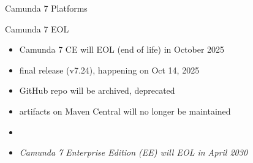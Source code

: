 \documentclass[12pt,aspectratio=169]{beamer}
\begin{document}
\begin{frame}{Camunda 7 Platforms}
\begin{minipage}{0.45\textwidth}
\end{minipage}
\end{frame}


\begin{frame}{Camunda 7 EOL}
\begin{itemize}
    \item Camunda 7 CE will EOL (end of life) in October 2025
    \item final release (v7.24), happening on Oct 14, 2025
    \item GitHub repo will be archived, deprecated
    \item artifacts on Maven Central will no longer be maintained
    \item[]
    \item[] \textit{Camunda 7 Enterprise Edition (EE) will EOL in April 2030}
\end{itemize}
\end{frame}
\end{document}
